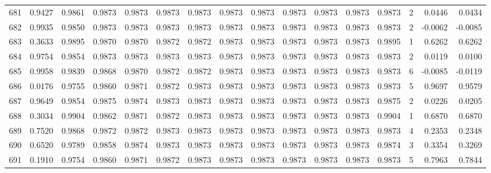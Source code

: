 \begin{tabular}{lrrrrrrrrrrrrrrr}
681 &      0.9427 &  0.9861 &  0.9873 &  0.9873 &  0.9873 &  0.9873 &  0.9873 &  0.9873 &  0.9873 &  0.9873 &   0.9873 &     0.9873 &      2 &                    0.0446 &                     0.0434 \\
682 &      0.9935 &  0.9850 &  0.9873 &  0.9873 &  0.9873 &  0.9873 &  0.9873 &  0.9873 &  0.9873 &  0.9873 &   0.9873 &     0.9873 &      2 &                   -0.0062 &                    -0.0085 \\
683 &      0.3633 &  0.9895 &  0.9870 &  0.9870 &  0.9872 &  0.9872 &  0.9873 &  0.9873 &  0.9873 &  0.9873 &   0.9873 &     0.9895 &      1 &                    0.6262 &                     0.6262 \\
684 &      0.9754 &  0.9854 &  0.9873 &  0.9873 &  0.9873 &  0.9873 &  0.9873 &  0.9873 &  0.9873 &  0.9873 &   0.9873 &     0.9873 &      2 &                    0.0119 &                     0.0100 \\
685 &      0.9958 &  0.9839 &  0.9868 &  0.9870 &  0.9872 &  0.9872 &  0.9873 &  0.9873 &  0.9873 &  0.9873 &   0.9873 &     0.9873 &      6 &                   -0.0085 &                    -0.0119 \\
686 &      0.0176 &  0.9755 &  0.9860 &  0.9871 &  0.9872 &  0.9873 &  0.9873 &  0.9873 &  0.9873 &  0.9873 &   0.9873 &     0.9873 &      5 &                    0.9697 &                     0.9579 \\
687 &      0.9649 &  0.9854 &  0.9875 &  0.9874 &  0.9873 &  0.9873 &  0.9873 &  0.9873 &  0.9873 &  0.9873 &   0.9873 &     0.9875 &      2 &                    0.0226 &                     0.0205 \\
688 &      0.3034 &  0.9904 &  0.9862 &  0.9871 &  0.9872 &  0.9873 &  0.9873 &  0.9873 &  0.9873 &  0.9873 &   0.9873 &     0.9904 &      1 &                    0.6870 &                     0.6870 \\
689 &      0.7520 &  0.9868 &  0.9872 &  0.9872 &  0.9873 &  0.9873 &  0.9873 &  0.9873 &  0.9873 &  0.9873 &   0.9873 &     0.9873 &      4 &                    0.2353 &                     0.2348 \\
690 &      0.6520 &  0.9789 &  0.9858 &  0.9874 &  0.9873 &  0.9873 &  0.9873 &  0.9873 &  0.9873 &  0.9873 &   0.9873 &     0.9874 &      3 &                    0.3354 &                     0.3269 \\
691 &      0.1910 &  0.9754 &  0.9860 &  0.9871 &  0.9872 &  0.9873 &  0.9873 &  0.9873 &  0.9873 &  0.9873 &   0.9873 &     0.9873 &      5 &                    0.7963 &                     0.7844 \\

\end{tabular}
